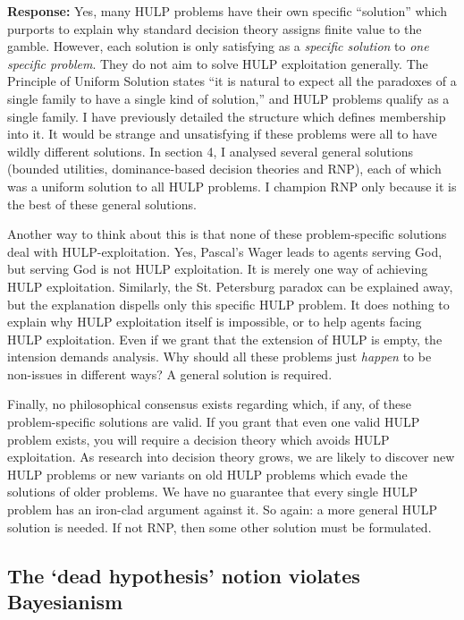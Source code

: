 \documentclass{article}
\begin{document}
\textbf{Response:} Yes, many HULP problems have their own specific ``solution'' which purports to explain why standard decision theory assigns finite value to the gamble. However, each solution is only satisfying as a \textit{specific solution} to \textit{one specific problem}. They do not aim to solve HULP exploitation generally. The Principle of Uniform Solution states ``it is natural to expect all the paradoxes of a single family to have a single kind of solution,'' \citep[pg. 32]{priest1994structure} and HULP problems qualify as a single family. I have previously detailed the structure which defines membership into it. It would be strange and unsatisfying if these problems were all to have wildly different solutions. In section 4, I analysed several general solutions (bounded utilities, dominance-based decision theories and RNP), each of which was a uniform solution to all HULP problems. I champion RNP only because it is the best of these general solutions. 

Another way to think about this is that none of these problem-specific solutions deal with HULP-exploitation. Yes, Pascal's Wager leads to agents serving God, but serving God is not HULP exploitation. It is merely one way of achieving HULP exploitation. Similarly, the St. Petersburg paradox can be explained away, but the explanation dispells only this specific HULP problem. It does nothing to explain why HULP exploitation itself is impossible, or to help agents facing HULP exploitation. Even if we grant that the extension of HULP is empty, the intension demands analysis. Why should all these problems just \textit{happen} to be non-issues in different ways? A general solution is required. 

Finally, no philosophical consensus exists regarding which, if any, of these problem-specific solutions are valid. If you grant that even one valid HULP problem exists, you will require a decision theory which avoids HULP exploitation. As research into decision theory grows, we are likely to discover new HULP problems \textemdash{} or new variants on old HULP problems \textemdash{} which evade the solutions of older problems. We have no guarantee that every single HULP problem has an iron-clad argument against it. So again: a more general HULP solution is needed. If not RNP, then some other solution must be formulated.

\subsection{The `dead hypothesis' notion violates Bayesianism} 
\end{document}
